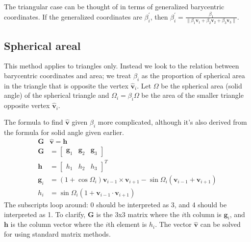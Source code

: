 \documentclass{amsart}[12pt]
\begin{document}
The triangular case can be thought of in terms of generalized
barycentric coordinates. If the generalized coordinates are
$\beta^\prime_i$, then $\beta^\prime_i = \frac{\beta_1}
{\|\beta_1 \mathbf v_1 + \beta_2 \mathbf v_2 + \beta_3 \mathbf v_3\|}$.

\subsection{Spherical areal}
This method applies to triangles only. Instead we look to the relation between
barycentric coordinates and area; we treat $\beta_i$ as the proportion of
spherical area in the triangle that is opposite the vertex $\hat{\mathbf v}_i$.
Let $\Omega$ be the spherical area (solid angle) of the spherical triangle and
$\Omega_i = \beta_i\Omega$ be the area of the smaller triangle opposite vertex
$\hat{\mathbf v}_i$.

The formula to find $\hat{\mathbf v}$ given $\beta_i$ more complicated,
although it's also derived from the formula for solid angle given earlier.
\begin{equation}
\label{eq:sphareal}
  \begin{split}
  \mathbf G & \hat{\mathbf v} = \mathbf h \\
   \mathbf G & = \begin{bmatrix}
   \mathbf g_1 & \mathbf g_2 & \mathbf g_3 \end{bmatrix} \\
   \mathbf h & = \begin{bmatrix} h_1  & h_2 & h_3  \end{bmatrix}^T \\
   \mathbf g_{i} & = \left(1+\cos \Omega_{i}\right) \mathbf v_{i-1} \times
   \mathbf v_{i+1} - \sin\Omega_{i}\left(\mathbf v_{i-1} +
   \mathbf v_{i+1}\right)\\
   h_i &= \sin\Omega_i\left(1+\mathbf v_{i-1}\cdot\mathbf v_{i+1}\right)
\end{split}\end{equation}
The subscripts loop around: 0 should be interpreted as 3, and 4 should be
interpreted as 1. To clarify, $\mathbf G$ is the 3x3 matrix where the $i$th
column is $\mathbf g_i$, and $\mathbf h$ is the column vector where the
$i$th element is $h_i$. The vector $\hat{\mathbf v}$
can be solved for using standard matrix methods.
\end{document}
